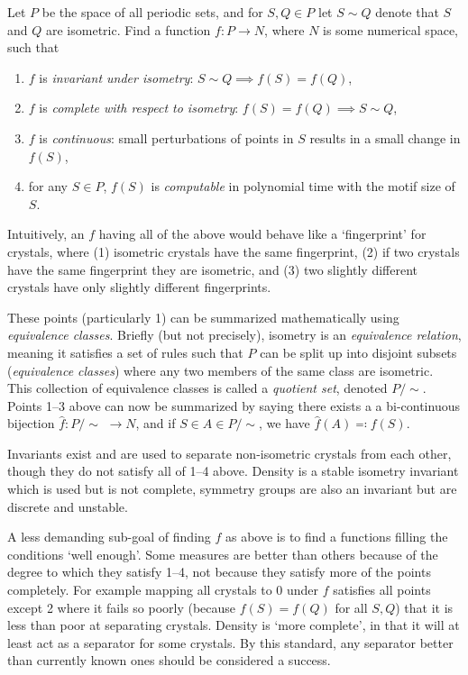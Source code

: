 \documentclass[11pt]{article}
\theoremstyle{definition}
\begin{document}
Let $P$ be the space of all periodic sets, and for $S,Q\in P$ let $S\sim Q$ denote that $S$ and $Q$ are isometric. Find a function $f:P\rightarrow N$, where $N$ is some numerical space, such that
\begin{enumerate}
\item $f$ is \emph{invariant under isometry}: $S\sim Q \implies f(S) = f(Q)$,
\item $f$ is \emph{complete with respect to isometry}: $f(S) = f(Q) \implies S \sim Q$,
\item $f$ is \emph{continuous}: small perturbations of points in $S$ results in a small change in $f(S)$,
\item for any $S\in P$, $f(S)$ is \emph{computable} in polynomial time with the motif size of $S$.
\end{enumerate}

Intuitively, an $f$ having all of the above would behave like a `fingerprint' for crystals, where  (1) isometric crystals have the same fingerprint, (2) if two crystals have the same fingerprint they are isometric, and (3) two slightly different crystals have only slightly different fingerprints.

These points (particularly 1) can be summarized mathematically using \emph{equivalence classes}. Briefly (but not precisely), isometry is an \emph{equivalence relation}, meaning it satisfies a set of rules such that $P$ can be split up into disjoint subsets (\emph{equivalence classes}) where any two members of the same class are isometric. This collection of equivalence classes is called a \emph{quotient set}, denoted $P/\sim$. Points 1--3 above can now be summarized by saying there exists a a bi-continuous bijection $\hat{f}: P /\sim \,\, \rightarrow N$, and if $S\in A\in P/\sim$, we have $\hat{f}(A) \eqqcolon f(S)$.

\null

Invariants exist and are used to separate non-isometric crystals from each other, though they do not satisfy all of 1--4 above. Density is a stable isometry invariant which is used but is not complete, symmetry groups are also an invariant but are discrete and unstable. 

A less demanding sub-goal of finding $f$ as above is to find a functions filling the conditions `well enough'. Some measures are better than others because of the degree to which they satisfy 1--4, not because they satisfy more of the points completely. For example mapping all crystals to 0 under $f$ satisfies all points except 2 where it fails so poorly (because $f(S)=f(Q)$ for all $S,Q$) that it is less than poor at separating crystals. Density is `more complete', in that it will at least act as a separator for some crystals. By this standard, any separator better than currently known ones should be considered a success.
\end{document}
